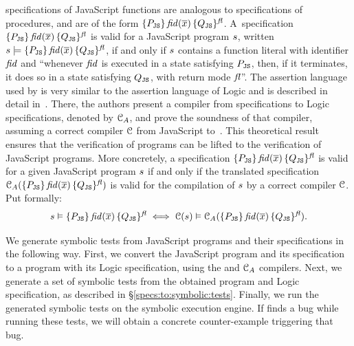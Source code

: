 \javert specifications of JavaScript functions are analogous to \jsil specifications of \jsil procedures, and are of the form $\{ P_{\mathtt{JS}} \} \, \mathit{fid}(\overline{x}) \, \{ Q_{\mathtt{JS}} \}^{\mathit{fl}}$. A~\javert specification $\{ P_{\mathtt{JS}} \} \, \mathit{fid}(\overline{x}) \, \{ Q_{\mathtt{JS}} \}^{\mathit{fl}}$
is valid for a JavaScript program $s$, written $s \models \{ P_{\mathtt{JS}} \} \, \mathit{fid}(\overline{x}) \, \{ Q_{\mathtt{JS}} \}^{\mathit{fl}}$, 
if and only if $s$ contains a function literal with identifier $\mathit{fid}$ and ``whenever $\mathit{fid}$ is executed in a state satisfying $P_{\mathtt{JS}}$, then, 
if it terminates, it does so in a state satisfying $Q_{\mathtt{JS}}$, with return mode $\mathit{fl}$''. The assertion language used by \javert is very similar to the assertion language of \jsil Logic and is described in detail in~\cite{javert}.
There, the authors present 
a compiler from \javert specifications to \jsil Logic specifications, denoted by $\mathcal{C}_A$, and prove the soundness 
of that compiler, assuming a correct compiler ${\mathcal C}$ from JavaScript to~\jsil.
This theoretical result ensures that the verification of \jsil programs can be lifted to   the verification of JavaScript programs. More concretely, a \javert  specification $\{ P_{\mathtt{JS}} \} \, \mathit{fid}(\overline{x}) \, \{ Q_{\mathtt{JS}} \}^{\mathit{fl}}$
is valid for a given JavaScript program $s$ if and only if the translated specification 
$\mathcal{C}_A(\{ P_{\mathtt{JS}} \} \, \mathit{fid}(\overline{x}) \, \{ Q_{\mathtt{JS}} \}^{\mathit{fl}})$ is valid for the compilation 
of $s$ by a correct compiler ${\mathcal C}$. Put formally:  
\begin{equation}
   s \vDash  \{ P_{\mathtt{JS}} \} \, \mathit{fid}(\overline{x}) \, \{ Q_{\mathtt{JS}} \}^{\mathit{fl}} 
      \iff
           {\mathcal C}(s) \vDash \mathcal{C}_A(\{ P_{\mathtt{JS}} \} \, \mathit{fid}(\overline{x}) \, \{ Q_{\mathtt{JS}} \}^{\mathit{fl}}).
\end{equation}

We generate symbolic tests from JavaScript programs and their \javert specifications in the following way. First, we convert the JavaScript program and its \javert specification to a \jsil program with its \jsil Logic specification, using the \JSComp and $\mathcal{C}_A$ compilers. Next, we 
generate a set of symbolic tests from the obtained \jsil program and \jsil Logic specification, as described in \S\ref{specs:to:symbolic:tests}. 
Finally, we run the generated \jsil symbolic tests on the \jsil symbolic execution engine. If \jilette finds a bug while running these tests, we will obtain a concrete counter-example triggering that bug.

